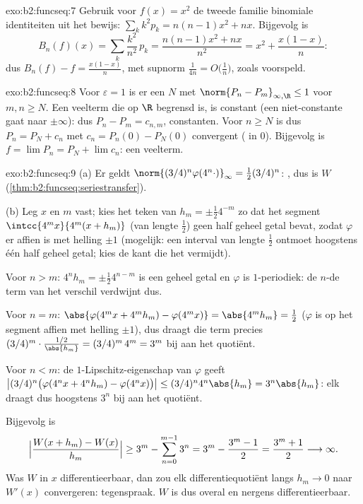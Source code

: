 \begin{solution}{exo:b2:funcseq:7}
Gebruik voor $f(x) = x^2$ de tweede familie binomiale
identiteiten uit het bewijs: $\sum_k k^2 p_k = n(n-1)x^2 + nx$.
Bijgevolg is
\[
B_n(f)(x) = \sum_k \frac{k^2}{n^2}\,p_k
= \frac{n(n-1)x^2 + nx}{n^2}
= x^2 + \frac{x(1 - x)}{n} :
\]
dus $B_n(f) - f = \frac{x(1-x)}{n}$, met supnorm $\frac{1}{4n} =
O\bigl(\frac1n\bigr)$, zoals voorspeld.
\end{solution}

\begin{solution}{exo:b2:funcseq:8}
Voor $\varepsilon = 1$ is er een $N$ met $\norm{P_n - P_m}_{\infty,
\R} \leq 1$ voor $m, n \geq N$. Een veelterm die op $\R$ begrensd
is, is constant (een niet-constante gaat naar $\pm\infty$): dus
$P_n - P_m = c_{n,m}$, constanten. Voor $n \geq N$ is dus $P_n =
P_N + c_n$ met $c_n = P_n(0) - P_N(0)$ convergent ( in $0$). Bijgevolg is $f = \lim P_n = P_N + \lim c_n$:
een veelterm.
\end{solution}

\begin{solution}{exo:b2:funcseq:9}
(a) Er geldt $\norm{(3/4)^n\varphi(4^n\cdot)}_\infty = \frac12
(3/4)^n$: , dus is $W$ 
(\cref{thm:b2:funcseq:seriestransfer}).

(b) Leg $x$ en $m$ vast; kies het teken van $h_m = \pm\frac12
4^{-m}$ zo dat het segment $\intcc{4^mx}{4^m(x + h_m)}$ (van lengte
$\frac12$) geen half geheel getal bevat, zodat $\varphi$ er affien
is met helling $\pm1$ (mogelijk: een interval van lengte $\frac12$
ontmoet hoogstens één half geheel getal; kies de kant die het
vermijdt).

Voor $n > m$: $4^n h_m = \pm\frac12 4^{n-m}$ is een geheel getal en
$\varphi$ is $1$-periodiek: de $n$-de term van het verschil
verdwijnt dus.

Voor $n = m$: $\abs{\varphi(4^m x + 4^m h_m) - \varphi(4^m x)} =
\abs{4^m h_m} = \frac12$ ($\varphi$ is op het segment affien met
helling $\pm 1$), dus draagt die term precies $(3/4)^m \cdot
\frac{1/2}{\abs{h_m}} = (3/4)^m\,4^m = 3^m$ bij aan het
quotiënt.

Voor $n < m$: de $1$-Lipschitz-eigenschap van $\varphi$ geeft
$\bigl|(3/4)^n\bigl(\varphi(4^nx + 4^nh_m) -
\varphi(4^nx)\bigr)\bigr| \leq (3/4)^n 4^n\abs{h_m} =
3^n\abs{h_m}$: elk draagt dus hoogstens $3^n$ bij aan het
quotiënt.

Bijgevolg is
\[
\Bigl|\frac{W(x + h_m) - W(x)}{h_m}\Bigr|
\geq 3^m - \sum_{n=0}^{m-1} 3^n
= 3^m - \frac{3^m - 1}{2} = \frac{3^m + 1}{2}
\longrightarrow \infty .
\]
Was $W$ in $x$ differentieerbaar, dan zou elk differentiequotiënt
langs $h_m \to 0$ naar $W'(x)$ convergeren: tegenspraak. $W$ is dus
overal  en nergens differentieerbaar.
\end{solution}

